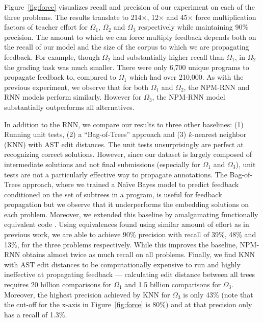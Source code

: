 Figure~\ref{fig:force} visualizes recall and precision of our experiment on each of the three problems. The results translate to 214$\times$, 12$\times$ and 45$\times$ force multiplication factors of teacher effort for $\Omega_1$, $\Omega_2$ and $\Omega_3$ respectively while maintaining 90\% precision. The amount to which we can force multiply feedback depends both on the recall of our model and the size of the corpus to which we are propagating feedback. For example, though $\Omega_2$ had substantially higher recall than $\Omega_1$, in $\Omega_2$ the grading task was much smaller. There were only 6,700 unique programs to propagate feedback to, compared to $\Omega_1$ which had over 210,000. 
As with the previous experiment, we observe that 
for both $\Omega_1$ and $\Omega_2$, the NPM-RNN and RNN models perform similarly. However for $\Omega_3$, the NPM-RNN model substantially outperforms all alternatives.

In addition to the RNN, we compare our results to three other baselines: (1) Running unit tests, (2) a ``Bag-of-Trees'' approach and (3) $k$-nearest neighbor (KNN) with AST edit distances.  The unit tests unsurprisingly are perfect at recognizing correct solutions. However, since our dataset is largely composed of intermediate solutions and not final submissions (especially for $\Omega_1$ and $\Omega_3$), unit tests are not a particularly effective way to propagate annotations. 
The Bag-of-Trees approach, where we trained a Na\"{i}ve Bayes model to predict feedback conditioned on the set of subtrees in a program,
is useful
for feedback propagation but we observe that it underperforms the embedding solutions on each problem. Moreover, we extended this baseline by amalgamating functionally equivalent code \cite{nguyen14}. Using equivalences found using similar amount of effort as in previous work, we are able to achieve 90\% precision with recall of 39\%, 48\% and 13\%, for the three problems respectively. While this improves the baseline, NPM-RNN obtains almost twice as much recall on all problems. Finally, we find KNN with AST edit distances to be computationally expensive to run and highly ineffective at propagating feedback --- calculating edit distance between all trees requires 20 billion comparisons for $\Omega_1$ and 1.5 billion comparisons for $\Omega_3$. Moreover, the highest precision achieved by KNN for $\Omega_3$ is only 43\% (note that the cut-off for the x-axis in Figure~\ref{fig:force} is 80\%) and at that precision only has a recall of 1.3\%. 

